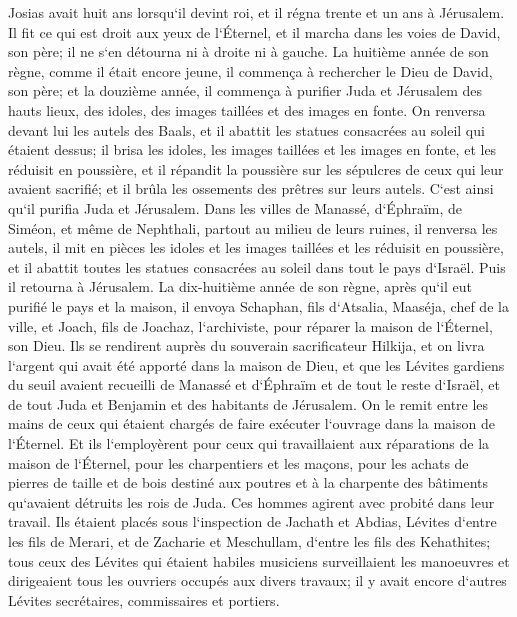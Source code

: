 \verse Josias avait huit ans lorsqu`il devint roi, et il régna trente et un ans à Jérusalem. 
\verse Il fit ce qui est droit aux yeux de l`Éternel, et il marcha dans les voies de David, son père; il ne s`en détourna ni à droite ni à gauche. 
\verse La huitième année de son règne, comme il était encore jeune, il commença à rechercher le Dieu de David, son père; et la douzième année, il commença à purifier Juda et Jérusalem des hauts lieux, des idoles, des images taillées et des images en fonte. 
\verse On renversa devant lui les autels des Baals, et il abattit les statues consacrées au soleil qui étaient dessus; il brisa les idoles, les images taillées et les images en fonte, et les réduisit en poussière, et il répandit la poussière sur les sépulcres de ceux qui leur avaient sacrifié; 
\verse et il brûla les ossements des prêtres sur leurs autels. C`est ainsi qu`il purifia Juda et Jérusalem. 
\verse Dans les villes de Manassé, d`Éphraïm, de Siméon, et même de Nephthali, partout au milieu de leurs ruines, 
\verse il renversa les autels, il mit en pièces les idoles et les images taillées et les réduisit en poussière, et il abattit toutes les statues consacrées au soleil dans tout le pays d`Israël. Puis il retourna à Jérusalem. 
\verse La dix-huitième année de son règne, après qu`il eut purifié le pays et la maison, il envoya Schaphan, fils d`Atsalia, Maaséja, chef de la ville, et Joach, fils de Joachaz, l`archiviste, pour réparer la maison de l`Éternel, son Dieu. 
\verse Ils se rendirent auprès du souverain sacrificateur Hilkija, et on livra l`argent qui avait été apporté dans la maison de Dieu, et que les Lévites gardiens du seuil avaient recueilli de Manassé et d`Éphraïm et de tout le reste d`Israël, et de tout Juda et Benjamin et des habitants de Jérusalem. 
\verse On le remit entre les mains de ceux qui étaient chargés de faire exécuter l`ouvrage dans la maison de l`Éternel. Et ils l`employèrent pour ceux qui travaillaient aux réparations de la maison de l`Éternel, 
\verse pour les charpentiers et les maçons, pour les achats de pierres de taille et de bois destiné aux poutres et à la charpente des bâtiments qu`avaient détruits les rois de Juda. 
\verse Ces hommes agirent avec probité dans leur travail. Ils étaient placés sous l`inspection de Jachath et Abdias, Lévites d`entre les fils de Merari, et de Zacharie et Meschullam, d`entre les fils des Kehathites; tous ceux des Lévites qui étaient habiles musiciens surveillaient les manoeuvres 
\verse et dirigeaient tous les ouvriers occupés aux divers travaux; il y avait encore d`autres Lévites secrétaires, commissaires et portiers. 
